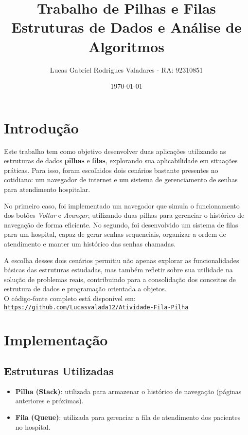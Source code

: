 \documentclass[12pt]{article}
\title{Trabalho de Pilhas e Filas\\\large Estruturas de Dados e Análise de Algoritmos}
\author{Lucas Gabriel Rodrigues Valadares - RA: 92310851}
\date{\today}
\begin{document}
\maketitle
\tableofcontents
\newpage

\section{Introdução}

Este trabalho tem como objetivo desenvolver duas aplicações utilizando as estruturas de dados \textbf{pilhas} e \textbf{filas}, explorando sua aplicabilidade em situações práticas. Para isso, foram escolhidos dois cenários bastante presentes no cotidiano: um navegador de internet e um sistema de gerenciamento de senhas para atendimento hospitalar.

No primeiro caso, foi implementado um navegador que simula o funcionamento dos botões \textit{Voltar} e \textit{Avançar}, utilizando duas pilhas para gerenciar o histórico de navegação de forma eficiente. No segundo, foi desenvolvido um sistema de filas para um hospital, capaz de gerar senhas sequenciais, organizar a ordem de atendimento e manter um histórico das senhas chamadas.

A escolha desses dois cenários permitiu não apenas explorar as funcionalidades básicas das estruturas estudadas, mas também refletir sobre sua utilidade na solução de problemas reais, contribuindo para a consolidação dos conceitos de estrutura de dados e programação orientada a objetos.
\\

O código-fonte completo está disponível em: \\\texttt{\url{https://github.com/Lucasvalada12/Atividade-Fila-Pilha}}

\section{Implementação}

\subsection{Estruturas Utilizadas}
\begin{itemize}
    \item \textbf{Pilha (Stack)}: utilizada para armazenar o histórico de navegação (páginas anteriores e próximas).
    \item \textbf{Fila (Queue)}: utilizada para gerenciar a fila de atendimento dos pacientes no hospital.
\end{itemize}
\end{document}

